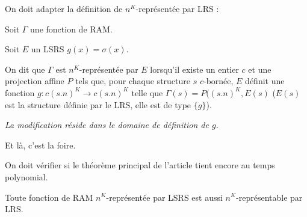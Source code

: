 \documentclass{report}
\begin{document}
		On doit adapter la définition de $n^K$-représentée par LRS : 
		
		\begin{definition}
			\label{def:representee_par_LRS}
			Soit $\Gamma$ une fonction de RAM. 
			
			Soit $E$ un LSRS $g(x) = \sigma(x)$. 
			
			On dit que $\Gamma$ est $n^K$-représentée par $E$ lorsqu'il existe un entier $c$ et une projection affine $P$ tels que, pour chaque structure $s$ $c$-bornée, $E$ définit une fonction $g : c (s.n)^K \to c (s.n)^K$ telle que $\Gamma(s) = P((s.n)^K, E(s)$ ($E(s)$ est la structure définie par le LRS, elle est de type $\{g\}$).
			
			\emph{La modification réside dans le domaine de définition de $g$.}
		\end{definition}
		
		Et là, c'est la foire.
		
		On doit vérifier si le théorème principal de l'article tient encore au temps polynomial.
		
		
		
		\begin{conj}
			\label{conj:rep_LSRS_rep_LRS}
			Toute fonction de RAM $n^K$-représentée par LSRS est aussi $n^K$-représentable par LRS.
		\end{conj}
		
\end{document}
